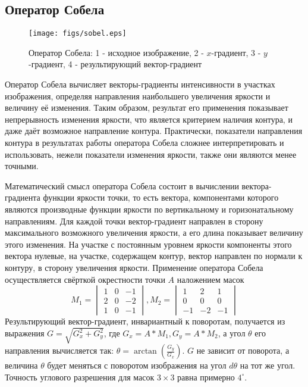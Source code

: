 \documentclass[a4paper,12pt]{report}
\begin{document}
\subsection{Оператор Собела}
\begin{figure}[!h]
\begin{center}\texttt{[image: figs/sobel.eps]}
\end{center}
\caption{Оператор Собела: 1 - исходное изображение, 2 - $x$-градиент, 3 - $y$-градиент, 4 - результирующий вектор-градиент}
\label{sobel}
\end{figure}
Оператор Собела вычисляет векторы-градиенты интенсивности в участках изображения, определяя направления наибольшего увеличения яркости и величину её изменения. Таким образом, результат его применения показывает непрерывность изменения яркости, что является критерием наличия контура, и даже даёт возможное направление контура. Практически, показатели направления контура в результатах работы оператора Собела сложнее интерпретировать и использовать, нежели показатели изменения яркости, также они являются менее точными.

Математический смысл оператора Собела состоит в вычислении вектора-градиента функции яркости точки, то есть вектора, компонентами которого являются производные функции яркости по вертикальному и горизонатальному направлениям. Для каждой точки вектор-градиент направлен в сторону максимального возможного увеличения яркости, а его длина показывает величину этого изменения. На участке с постоянным уровнем яркости компоненты этого вектора нулевые, на участке, содержащем контур, вектор направлен по нормали к контуру, в сторону увеличения яркости. Применение оператора Собела осуществляется свёрткой окрестности точки $A$ наложением масок 
\begin{equation}
M_1=\begin{vmatrix}1 & 0 & -1 \\
2 & 0 & -2\\
1 & 0 & -1\end{vmatrix}, M_2=\begin{vmatrix}1& 2 & 1 \\
0 & 0 & 0\\
-1 & -2 & -1\end{vmatrix}
\end{equation}
Результирующий вектор-градиент, инвариантный к поворотам, получается из выражения $G = \sqrt{G_x^2 + G_y^2}$, где $G_x = A\ast M_1, G_y=A\ast M_2$, а угол $\theta$ его направления вычисляется так: $\theta=\arctan(\frac{G_y}{G_x})$. $G$ не зависит от поворота, а величина $\theta$ будет меняться с поворотом изображения на угол $d\theta$ на тот же угол. Точность углового разрешения для масок $3\times 3$ равна примерно $4^\circ$. 
\end{document}
